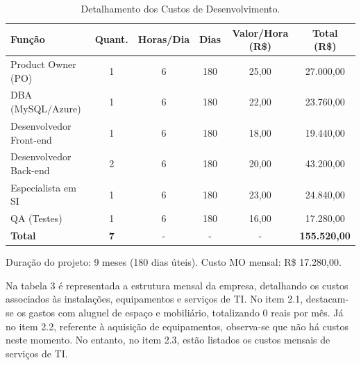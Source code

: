 \documentclass[
	12pt,				%
	openany,			%
	twoside,			%
	a4paper,			%
	english,			%
	brazil				%
	]{abntex2}
\begin{document}
\begin{table}[hbtp]
    \centering
    \caption{Detalhamento dos Custos de Desenvolvimento.}
    \label{tab:custos_desenvolvimento_simples}
    \begin{tabular}{|l|c|c|c|c|c|}
        \hline
        \textbf{Função} & \textbf{Quant.} & \textbf{Horas/Dia} & \textbf{Dias} & \textbf{Valor/Hora (R\$)} & \textbf{Total (R\$)} \\
        \hline
        Product Owner (PO)    & 1 & 6 & 180 & 25,00 & 27.000,00 \\
        \hline
        DBA (MySQL/Azure)     & 1 & 6 & 180 & 22,00 & 23.760,00 \\
        \hline
        Desenvolvedor Front-end & 1 & 6 & 180 & 18,00 & 19.440,00 \\
        \hline
        Desenvolvedor Back-end  & 2 & 6 & 180 & 20,00 & 43.200,00 \\
        \hline
        Especialista em SI    & 1 & 6 & 180 & 23,00 & 24.840,00 \\
        \hline
        QA (Testes)           & 1 & 6 & 180 & 16,00 & 17.280,00 \\
        \hline
        \textbf{Total} & \textbf{7} & - & - & - & \textbf{155.520,00} \\
        \hline
    \end{tabular}
    Duração do projeto: 9 meses (180 dias úteis). Custo MO mensal: R\$ 17.280,00.
\end{table}

Na tabela 3 é representada a estrutura mensal da empresa, detalhando os custos associados às instalações, equipamentos e serviços de TI. No item 2.1, destacam-se os gastos com aluguel de espaço e mobiliário, totalizando 0 reais por mês. Já no item 2.2, referente à aquisição de equipamentos, observa-se que não há custos neste momento. No entanto, no item 2.3, estão listados os custos mensais de serviços de TI.
\end{document}
